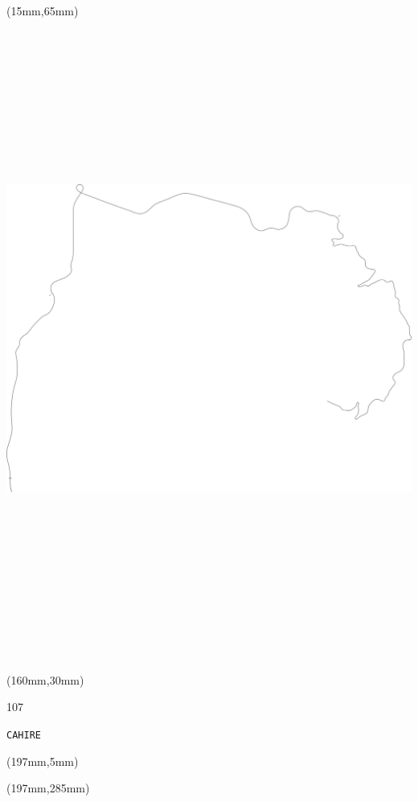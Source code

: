 \begin{textblock*}{185mm}(15mm,65mm)%
\centering
\mbox{\includegraphics[width=185mm,height=210mm,keepaspectratio]{PT/CAHIRE.pdf}}
\end{textblock*}
\begin{textblock*}{40mm}(160mm,30mm)%
\Large
\par{} 
\par107 
\par\hfill\tiny\tt CAHIRE\\
\end{textblock*}
\begin{textblock*}{20mm}(197mm,5mm)%
\fbox{\thepage}
\label{CAHIRE}
\end{textblock*}
\begin{textblock*}{20mm}(197mm,285mm)%
\fbox{\thepage}
\end{textblock*}

